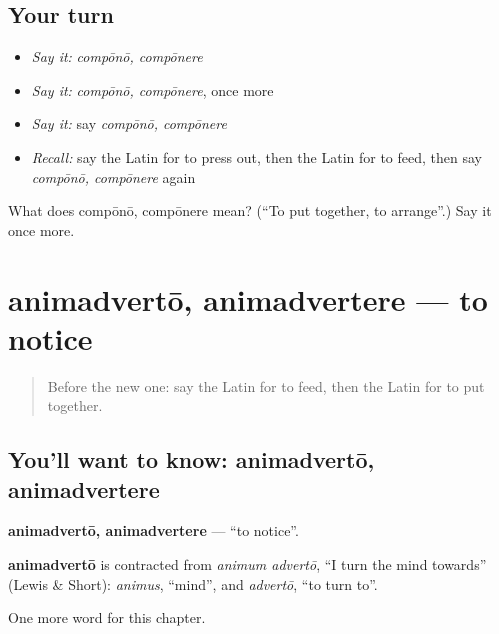 \subsection*{Your turn}
\begin{itemize}
\raggedright
  \item \emph{Say it:} \emph{compōnō, compōnere}
  \item \emph{Say it:} \emph{compōnō, compōnere}, once more
  \item \emph{Say it:} say \emph{compōnō, compōnere}
  \item \emph{Recall:} say the Latin for to press out, then the Latin for to feed, then say \emph{compōnō, compōnere} again
\end{itemize}

\begin{tcolorbox}[breakable,colback=teal!4,colframe=teal!35!black,title={Before you move on}]
What does compōnō, compōnere mean? (\textquotedblleft{}To put together, to arrange\textquotedblright{}.) Say it once more.
\end{tcolorbox}
\section[animadvertō, animadvertere]{animadvertō, animadvertere — to notice}

\label{lesson:LA-C260-animadverto}



\begin{quote}
Before the new one: say the Latin for to feed, then the Latin for to put together.
\end{quote}

\subsection*{You'll want to know: animadvertō, animadvertere}
\textbf{animadvertō, animadvertere} — \textquotedblleft{}to notice\textquotedblright{}.

\begin{cousinweb}
\textbf{animadvertō} is contracted from \emph{animum advertō}, \textquotedblleft{}I turn the mind towards\textquotedblright{} (Lewis \& Short): \emph{animus}, \textquotedblleft{}mind\textquotedblright{}, and \emph{advertō}, \textquotedblleft{}to turn to\textquotedblright{}.
\end{cousinweb}

\begin{grammarlens}[title={What you've built}]
One more word for this chapter.
\end{grammarlens}

